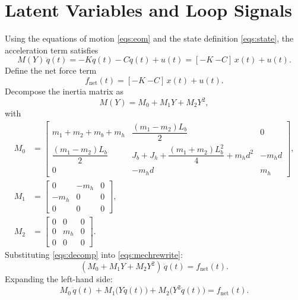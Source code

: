 \documentclass[11pt]{article}
\begin{document}
\section{Latent Variables and Loop Signals}
Using the equations of motion \eqref{eqs:eom} and the state definition
\eqref{eqs:state}, the acceleration term satisfies
\begin{equation}
    M(Y)\,\ddot{q}(t)
    =
    -K q(t) - C\dot{q}(t) + u(t)
    =
    [-K\ {-C}]\,x(t) + u(t).
    \label{eqs:mechrewrite}
\end{equation}
Define the net force term
\begin{equation}
    f_{\mathrm{net}}(t) = [-K\ {-C}]\,x(t) + u(t).
    \label{eqs:fgen}
\end{equation}
Decompose the inertia matrix as
\begin{equation}
    M(Y) = M_0 + M_1 Y + M_2 Y^2,
    \label{eqs:decomp}
\end{equation}
with
\begin{align}
    M_0 &=
    \begin{bmatrix}
        m_1 + m_2 + m_b + m_h &
        \dfrac{(m_1-m_2)L_b}{2} &
        0 \\
        \dfrac{(m_1-m_2)L_b}{2} &
        J_b + J_h + \dfrac{(m_1+m_2)L_b^2}{4} + m_h d^2 &
        -m_h d \\
        0 & -m_h d & m_h
    \end{bmatrix},
    \label{eqs:M0} \\
    M_1 &=
    \begin{bmatrix}
        0 & -m_h & 0 \\
        -m_h & 0 & 0 \\
        0 & 0 & 0
    \end{bmatrix},
    \label{eqs:M1} \\
    M_2 &=
    \begin{bmatrix}
        0 & 0 & 0 \\
        0 & m_h & 0 \\
        0 & 0 & 0
    \end{bmatrix}.
    \label{eqs:M2}
\end{align}
Substituting \eqref{eqs:decomp} into \eqref{eqs:mechrewrite}:
\begin{equation}
    (M_0 + M_1 Y + M_2 Y^2)\,\ddot{q}(t) = f_{\mathrm{net}}(t).
    \label{eqs:polyexpand_M}
\end{equation}
Expanding the left-hand side:
\begin{equation}
    M_0\,\ddot{q}(t) + M_1\bigl(Y\ddot{q}(t)\bigr) + M_2\bigl(Y^2\ddot{q}(t)\bigr) = f_{\mathrm{net}}(t).
    \label{eqs:polyexpanded}
\end{equation}
\end{document}
